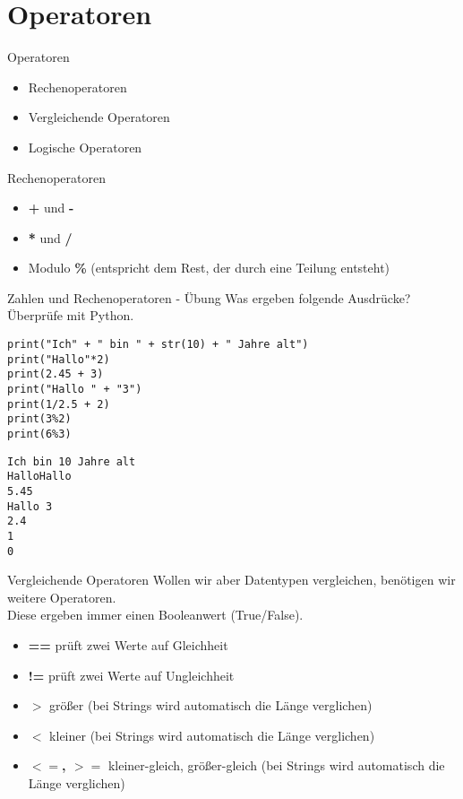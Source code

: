 \section{Operatoren}

\begin{frame}[fragile]{Operatoren}
\begin{itemize}
	\item Rechenoperatoren 
	\item Vergleichende Operatoren
	\item Logische Operatoren
\end{itemize}
\end{frame}

\begin{frame}[fragile]{Rechenoperatoren}
\begin{itemize}
\item \textbf{+} und \textbf{-}
\item \textbf{*} und \textbf{/}
\item Modulo \textbf{\%} (entspricht dem Rest, der durch eine Teilung entsteht)
\end{itemize}
\end{frame}


\begin{frame}[fragile]{Zahlen und Rechenoperatoren - Übung}
Was ergeben folgende Ausdrücke? Überprüfe mit  Python.
\begin{lstlisting}
print("Ich" + " bin " + str(10) + " Jahre alt") 
print("Hallo"*2)
print(2.45 + 3)
print("Hallo " + "3")
print(1/2.5 + 2)
print(3%2)
print(6%3)
\end{lstlisting}
\pause{}
\begin{lstlisting}
Ich bin 10 Jahre alt
HalloHallo
5.45 
Hallo 3
2.4
1
0
\end{lstlisting}
\end{frame}



\begin{frame}[fragile]{Vergleichende Operatoren}
Wollen wir aber Datentypen vergleichen, benötigen wir weitere Operatoren.\\
Diese ergeben immer einen Booleanwert (True/False).\\

\begin{itemize}
\item \textbf{==} prüft zwei Werte auf Gleichheit
\item \textbf{!=} prüft zwei Werte auf Ungleichheit
\item \textbf{$>$} größer (bei Strings wird automatisch die Länge verglichen)
\item \textbf{$<$} kleiner (bei Strings wird automatisch die Länge verglichen)
\item \textbf{$<=$, $>=$}  kleiner-gleich, größer-gleich (bei Strings wird automatisch die Länge verglichen)

\end{itemize}
\end{frame}

